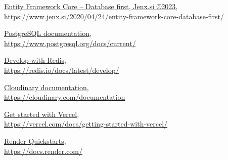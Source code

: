 \documentclass[12pt, a4paper]{report}
\theoremstyle{definition}
\begin{document}
\begin{thebibliography}{80}
     \href{https://www.jenx.si/2020/04/24/entity-framework-core-database-first/}{\color{black}Entity Framework Core – Database first, Jenx.si ©2023, \\https://www.jenx.si/2020/04/24/entity-framework-core-database-first/}
   
     \href{ https://www.postgresql.org/docs/current/}{\color{black}PostgreSQL documentation,\\ https://www.postgresql.org/docs/current/}

     \href{https://redis.io/docs/latest/develop/}{\color{black}Develop with Redis,\\https://redis.io/docs/latest/develop/}

     \href{https://cloudinary.com/documentation}{\color{black}Cloudinary documentation,\\https://cloudinary.com/documentation}

     \href{https://vercel.com/docs/getting-started-with-vercel}{\color{black}Get started with Vercel,\\https://vercel.com/docs/getting-started-with-vercel/}

     \href{https://docs.render.com/}{\color{black}Render Quickstarts,\\https://docs.render.com/}

 
\end{thebibliography}
\end{document}
